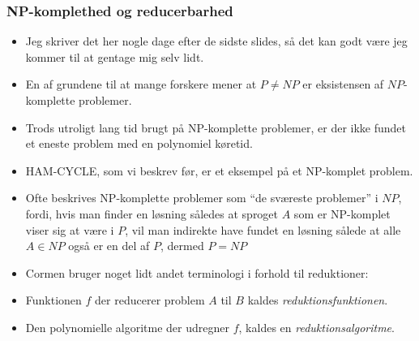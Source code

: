 \begin{frame}[allowframebreaks]
	\frametitle{NP-komplethed og reducerbarhed}

	\begin{itemize}
		\item Jeg skriver det her nogle dage efter de sidste slides, så det kan godt være jeg kommer til at gentage mig selv lidt.
		\item En af grundene til at mange forskere mener at $P \ne NP$ er eksistensen af $NP$-komplette problemer.
		\item Trods utroligt lang tid brugt på NP-komplette problemer, er der ikke fundet et eneste problem med en polynomiel køretid.
		\item HAM-CYCLE, som vi beskrev før, er et eksempel på et NP-komplet problem.
		\item Ofte beskrives NP-komplette problemer som ``de sværeste problemer'' i $NP$, fordi, hvis man finder en løsning således at sproget $A$ som er NP-komplet viser sig at være i $P$, vil man indirekte have fundet en løsning sålede at alle $A \in NP$ også er en del af $P$, dermed $P = NP$
		\item Cormen bruger noget lidt andet terminologi i forhold til reduktioner:
		\item Funktionen $f$ der reducerer problem $A$ til $B$ kaldes \textit{reduktionsfunktionen}.
		\item Den polynomielle algoritme der udregner $f$, kaldes en \textit{reduktionsalgoritme}.
	\end{itemize}
\end{frame}

